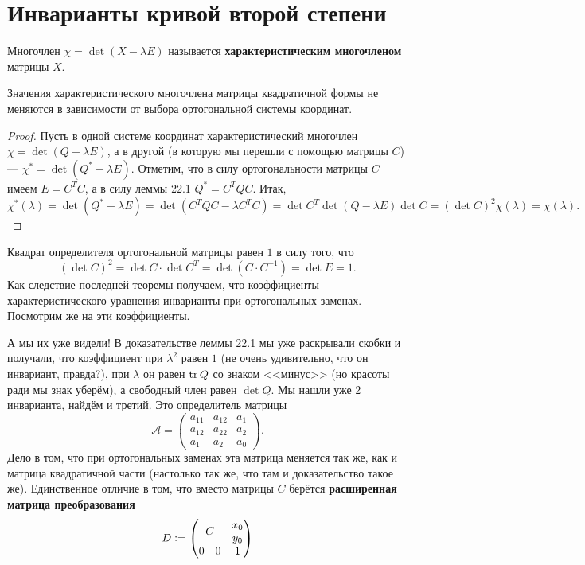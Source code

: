 \section{Инварианты кривой второй степени}

\begin{definition}
    Многочлен $\chi = \det(X - \lambda E)$ называется \textbf{характеристическим многочленом} матрицы $X$.
\end{definition}

\begin{theorem}
    Значения характеристического многочлена матрицы квадратичной формы не меняются в зависимости от выбора ортогональной системы координат.
\end{theorem}

\begin{proof}
    Пусть в одной системе координат характеристический многочлен $\chi = \det(Q - \lambda E)$, а в другой (в которую мы перешли с помощью матрицы $C$) --- $\chi^\ast = \det(Q^\ast - \lambda E)$. Отметим, что в силу ортогональности матрицы $C$ имеем $E = C^TC$, а в силу леммы 22.1 $Q^\ast = C^TQC$. Итак,
    $$
    \chi^\ast(\lambda) = \det(Q^\ast - \lambda E) = \det(C^TQC - \lambda C^TC) = \det C^T\det(Q - \lambda E)\det C = (\det C)^2\chi(\lambda) = \chi(\lambda).
    $$
\end{proof}

\begin{orangebox}
    Квадрат определителя ортогональной матрицы равен $1$ в силу того, что
    $$
    (\det C)^2 = \det C \cdot \det C^T = \det(C \cdot C^{-1}) = \det E = 1.
    $$
    Как следствие последней теоремы получаем, что коэффициенты характеристического уравнения инварианты при ортогональных заменах. Посмотрим же на эти коэффициенты.
\end{orangebox}

А мы их уже видели! В доказательстве леммы 22.1 мы уже раскрывали скобки и получали, что коэффициент при $\lambda^2$ равен $1$ (не очень удивительно, что он инвариант, правда?), при $\lambda$ он равен $\mathrm{tr}\, Q$ со знаком <<минус>> (но красоты ради мы знак уберём), а свободный член равен $\det Q$. Мы нашли уже 2 инварианта, найдём и третий. Это определитель матрицы
$$
\mathcal{A} =
\begin{pmatrix}
    a_{11} & a_{12} & a_1\\
    a_{12} & a_{22} & a_2\\
    a_1 & a_2 & a_0
\end{pmatrix}.
$$
Дело в том, что при ортогональных заменах эта матрица меняется так же, как и матрица квадратичной части (настолько так же, что там и доказательство такое же). Единственное отличие в том, что вместо матрицы $C$ берётся \textbf{расширенная матрица преобразования}
$$
D \vcentcolon = 
\begin{pmatrix}
    \multicolumn{2}{c}{\multirow{2}{*}{$C$}} & x_0\\
    \multicolumn{2}{c}{} & y_0\\
    0 & 0 & 1
\end{pmatrix}
$$

